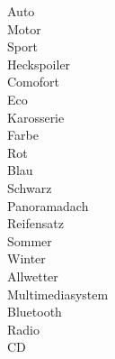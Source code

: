 \noindent
\unfold\blank\myPlus Auto\\
\tab\unfold\mandatory\myPlus Motor\\
\tab\tab\unfold\Alternative\myMinus Sport\\
\tab\tab\tab\nofold\optional\myMinus Heckspoiler\\
\tab\tab\nofold\Alternative\myPlusblank Comofort\\
\tab\tab\nofold\Alternative\myMinus Eco\\
\tab\unfold\mandatory\myPlus Karosserie\\
\tab\tab\unfold\mandatory\myPlus Farbe\\
\tab\tab\tab\nofold\Alternative\myPlusblank Rot\\
\tab\tab\tab\nofold\Alternative\myMinus Blau\\
\tab\tab\tab\nofold\Alternative\myMinus Schwarz\\
\tab\tab\nofold\optional\myBox Panoramadach\\
\tab\unfold\mandatory\myPlus Reifensatz\\
\tab\tab\nofold\myOr\myPlusblank Sommer\\
\tab\tab\nofold\myOr\myBox Winter\\
\tab\tab\nofold\myOr\myBox Allwetter\\
\tab\unfold\mandatory\myPlus Multimediasystem\\
\tab\tab\nofold\optional\myBox Bluetooth\\
\tab\tab\nofold\optional\myBox Radio\\
\tab\tab\nofold\optional\myBox CD\\
